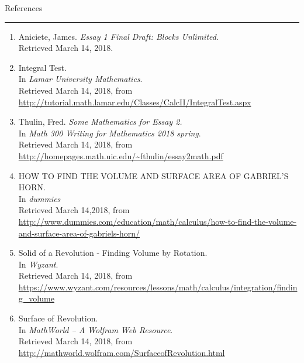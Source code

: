 \documentclass[12pt]{article}
\begin{document}
\newpage
{\Large References}\\
\rule{5in}{.01in}

\begin{enumerate}
\item Aniciete, James. {\em Essay 1 Final Draft: Blocks Unlimited}.\\
Retrieved March 14, 2018.\\
\item Integral Test.\\
In {\em Lamar University Mathematics}.\\
Retrieved March 14, 2018, from \\
\url{http://tutorial.math.lamar.edu/Classes/CalcII/IntegralTest.aspx}
\item Thulin, Fred. {\em Some Mathematics for Essay 2.}\\
In {\em Math 300 Writing for Mathematics 2018 spring}.\\
Retrieved March 14, 2018, from\\
\url{http://homepages.math.uic.edu/~fthulin/essay2math.pdf}
\item HOW TO FIND THE VOLUME AND SURFACE AREA OF GABRIEL'S HORN.\\
In {\em dummies}\\
Retrieved March 14,2018, from\\
\url{http://www.dummies.com/education/math/calculus/how-to-find-the-volume-and-surface-area-of-gabriels-horn/}
\item Solid of a Revolution - Finding Volume by Rotation.\\
In {\em Wyzant}.\\
Retrieved March 14, 2018, from\\
\url{https://www.wyzant.com/resources/lessons/math/calculus/integration/finding_volume}
\item Surface of Revolution.\\
In {\em MathWorld -- A Wolfram Web Resource}.\\
Retrieved March 14, 2018, from\\
\url{http://mathworld.wolfram.com/SurfaceofRevolution.html}
\end{enumerate}
\end{document}

